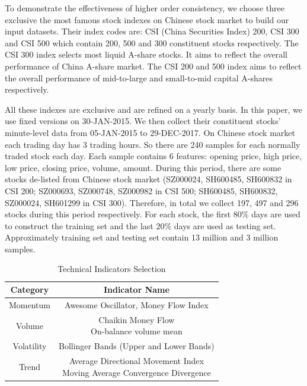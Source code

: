 \documentclass[sigconf, anonymous, review]{acmart}
\begin{document}
To demonstrate the effectiveness of higher order consistency, we
choose three exclusive the most famous stock indexes on Chinese
stock market to build our input datasets. Their index codes are:
CSI (China Securities Index) 200, CSI 300 and CSI 500 which
contain 200, 500 and 300 constituent stocks respectively. The CSI
300 index selects most liquid A-share stocks. It aims to reflect
the overall performance of China A-share market. The CSI 200 and
500 index aims to reflect the overall performance of mid-to-large
and small-to-mid capital A-shares respectively.

All these indexes are exclusive and are refined on a yearly
basis. In this paper, we use fixed versions on 30-JAN-2015. We
then collect their constituent stocks' minute-level data from
05-JAN-2015 to 29-DEC-2017. On Chinese stock market each trading
day has 3 trading hours. So there are 240 samples for each
normally traded stock each day. Each sample contains 6 features:
opening price, high price, low price, closing price, volume,
amount. During this period, there are some stocks de-listed from
Chinese stock market (SZ000024, SH600485, SH600832 in CSI 200;
SZ000693, SZ000748, SZ000982 in CSI 500; SH600485, SH600832,
SZ000024, SH601299 in CSI 300). Therefore, in total we collect
197, 497 and 296 stocks during this period respectively. For each
stock, the first $80\%$ days are used to construct the training
set and the last $20\%$ days are used as testing set.
Approximately training set and testing set contain 13 million and
3 million samples.

\begin{table}[H]
\centering
\caption{Technical Indicators Selection}
\begin{tabular}{|c|c|} \hline
  Category&Indicator Name\\ \hline
  Momentum& Awesome Oscillator, Money Flow Index\\ \hline
  Volume& \makecell{Chaikin Money Flow\\ On-balance volume mean}\\ \hline
  Volatility& Bollinger Bands (Upper and Lower Bands)\\ \hline
  Trend& \makecell{Average Directional Movement Index\\Moving Average Convergence Divergence}\\ \hline
\end{tabular}
  \label{tab:ta}
\end{table}
\end{document}
